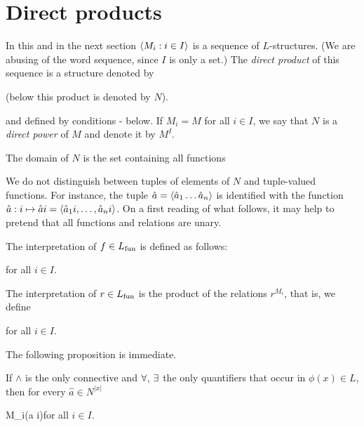 \documentclass[creche.tex]{subfiles}
\begin{document}
\section{Direct products}
\label{prodottidiretti}

In this and in the next section $\langle M_i:i\in I\rangle$ is a sequence of $L$-structures. (We are abusing of the word sequence, since $I$ is only a set.) The \emph{direct product\/} of this sequence is a structure denoted by

\hfill (below this product is denoted by  \emph{$N$\/}).\bigskip

and defined by conditions - below. If $M_i=M$ for all $i\in I$, we say that $N$ is a \emph{direct power\/} of $M$ and denote it by \emph{$M^I$}.

The domain of $N$ is the set containing all functions

\smallskip


We do not distinguish between tuples of elements of $N$ and tuple-valued functions. For instance, the tuple $\hat a=\langle\hat a_1\dots\hat a_n\rangle$ is identified with the function $\hat a:i\mapsto\hat ai=\langle\hat a_1i,\dots,\hat a_ni\rangle$. On a first reading of what follows, it may help to pretend that all functions and relations are unary.

The interpretation of $f\in L_{\rm fun}$ is defined as follows:

\hfill  for all $i\in I$.

The interpretation of $r\in L_{\rm fun}$ is the product of the relations $r^{M_i}$, that is, we define

\hfill  for all $i\in I$.


The following proposition is immediate.

\begin{proposition}\label{proposizioneprodottidiretti}
If $\wedge$ is the only connective and $\forall$, $\exists$ the only quantifiers that occur in $\phi(x)\in L$, then for every $\hat a\in N^{|x|}$

{\IFF}
{M_i\models\phi(\hat a i)}\hfill for all $i\in I$.

\end{proposition}
\end{document}
